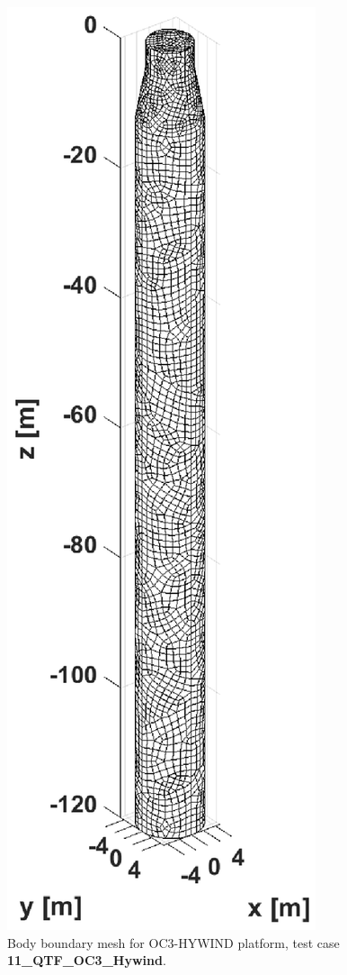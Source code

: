 \documentclass[12pt,a4paper,titlepage]{article}
\begin{document}
\begin{figure}[h!tbp]
\includegraphics[scale=0.5,trim = 160mm 0mm 160mm 0mm, clip]{figures/OC3_HYWIND/bodyMesh.eps}	
\caption{Body boundary mesh for OC3-HYWIND platform, test case \textbf{11\_QTF\_OC3\_Hywind}.}\label{fig:meshesHYWIND}
\end{figure}
\end{document}

